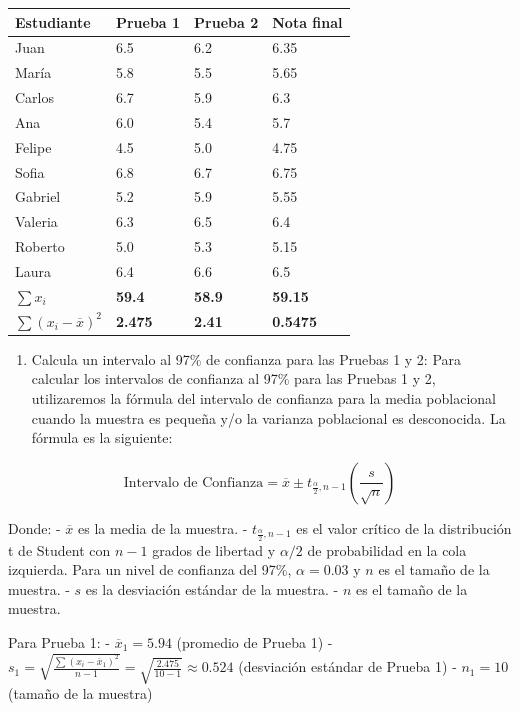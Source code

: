 \documentclass[
  letterpaper,
  DIV=11,
  numbers=noendperiod]{scrartcl}
\providecommand{\tightlist}{%
  \setlength{\itemsep}{0pt}\setlength{\parskip}{0pt}}\usepackage{longtable,booktabs,array}
\begin{document}
\begin{longtable}[]{@{}llll@{}}
\toprule\noalign{}
Estudiante & Prueba 1 & Prueba 2 & Nota final \\
\midrule\noalign{}
\endhead
\bottomrule\noalign{}
\endlastfoot
Juan & 6.5 & 6.2 & 6.35 \\
María & 5.8 & 5.5 & 5.65 \\
Carlos & 6.7 & 5.9 & 6.3 \\
Ana & 6.0 & 5.4 & 5.7 \\
Felipe & 4.5 & 5.0 & 4.75 \\
Sofia & 6.8 & 6.7 & 6.75 \\
Gabriel & 5.2 & 5.9 & 5.55 \\
Valeria & 6.3 & 6.5 & 6.4 \\
Roberto & 5.0 & 5.3 & 5.15 \\
Laura & 6.4 & 6.6 & 6.5 \\
\(\sum{x_i}\) & \textbf{59.4} & \textbf{58.9} & \textbf{59.15} \\
\(\sum{(x_i - \overline{x})^2}\) & \textbf{2.475} & \textbf{2.41} &
\textbf{0.5475} \\
\end{longtable}

\begin{enumerate}
\def\labelenumi{\roman{enumi}.}
\tightlist
\item
  Calcula un intervalo al 97\% de confianza para las Pruebas 1 y 2: Para
  calcular los intervalos de confianza al 97\% para las Pruebas 1 y 2,
  utilizaremos la fórmula del intervalo de confianza para la media
  poblacional cuando la muestra es pequeña y/o la varianza poblacional
  es desconocida. La fórmula es la siguiente:
\end{enumerate}

\[\text{Intervalo de Confianza} = \overline{x} \pm t_{\frac{\alpha}{2}, n-1} \left(\frac{s}{\sqrt{n}}\right)\]

Donde: - \(\overline{x}\) es la media de la muestra. -
\(t_{\frac{\alpha}{2}, n-1}\) es el valor crítico de la distribución t
de Student con \(n-1\) grados de libertad y \(\alpha/2\) de probabilidad
en la cola izquierda. Para un nivel de confianza del 97\%,
\(\alpha = 0.03\) y \(n\) es el tamaño de la muestra. - \(s\) es la
desviación estándar de la muestra. - \(n\) es el tamaño de la muestra.

Para Prueba 1: - \(\overline{x}_1 = 5.94\) (promedio de Prueba 1) -
\(s_1 = \sqrt{\frac{\sum{(x_i - \overline{x}_1)^2}}{n-1}} = \sqrt{\frac{2.475}{10-1}} \approx 0.524\)
(desviación estándar de Prueba 1) - \(n_1 = 10\) (tamaño de la muestra)
\end{document}
